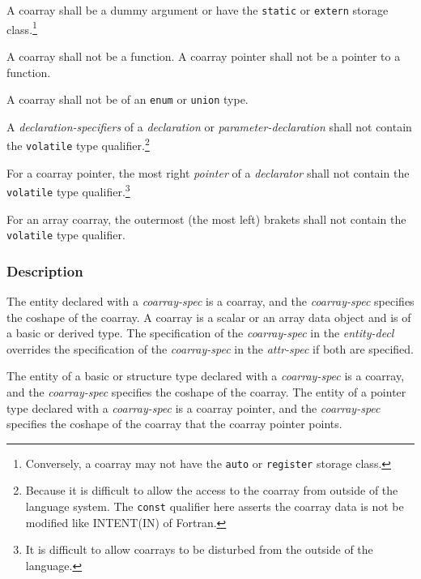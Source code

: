 \begin{Constraints C}
\item A coarray shall be a dummy argument or have the {\tt static} or {\tt extern} 
storage class.\footnote
{Conversely, a coarray may not have the {\tt auto} or {\tt register} 
storage class.}

\item A coarray shall not be a function. 
A coarray pointer shall not be a pointer to a function.

\item A coarray shall not be of an {\tt enum} or {\tt union} type.

\item A {\it declaration-specifiers} of a {\it declaration} or 
{\it parameter-declaration} shall not contain the {\tt volatile} type qualifier.\footnote
{Because it is difficult to allow the access to the coarray from outside of the 
language system.
The {\tt const} qualifier here asserts the coarray data is not be modified 
like INTENT(IN) of Fortran.}

\item For a coarray pointer, the most right {\it pointer} of a {\it declarator} 
shall not contain the {\tt volatile} type qualifier.\footnote
{It is difficult to allow coarrays to be disturbed from the outside of the language.}

\item For an array coarray, the outermost (the most left) brakets shall not contain the {\tt volatile} type qualifier.

\end{Constraints C}


\subsubsection*{Description}

{\onlyF} The entity declared with a {\it coarray-spec} is a coarray, and
the {\it coarray-spec} specifies the coshape of the coarray.
A coarray is a scalar or an array data object and is of a basic or derived type.
The specification of the {\it coarray-spec} in the {\it entity-decl} 
overrides the specification of the {\it coarray-spec} in the {\it attr-spec}
if both are specified.

{\onlyC} The entity of a basic or structure type declared with a {\it coarray-spec} 
is a coarray, and the {\it coarray-spec} specifies the coshape of the coarray.
The entity of a pointer type declared with a {\it coarray-spec} is a coarray pointer, 
and the {\it coarray-spec} specifies the coshape of the coarray that the coarray pointer points.

